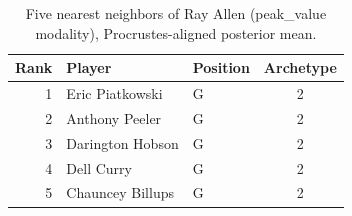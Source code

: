 \begin{table}[htbp]
  \centering\small
  \begin{tabular}{rllc}
    \toprule
    Rank & Player & Position & Archetype \\
    \midrule
    1 & Eric Piatkowski & G & 2 \\
    2 & Anthony Peeler & G & 2 \\
    3 & Darington Hobson & G & 2 \\
    4 & Dell Curry & G & 2 \\
    5 & Chauncey Billups & G & 2 \\
    \bottomrule
  \end{tabular}
  \caption{Five nearest neighbors of Ray Allen (peak_value modality), Procrustes-aligned posterior mean.}
  \label{tab:Ray_Allen_neighbors_peak_value}
\end{table}

